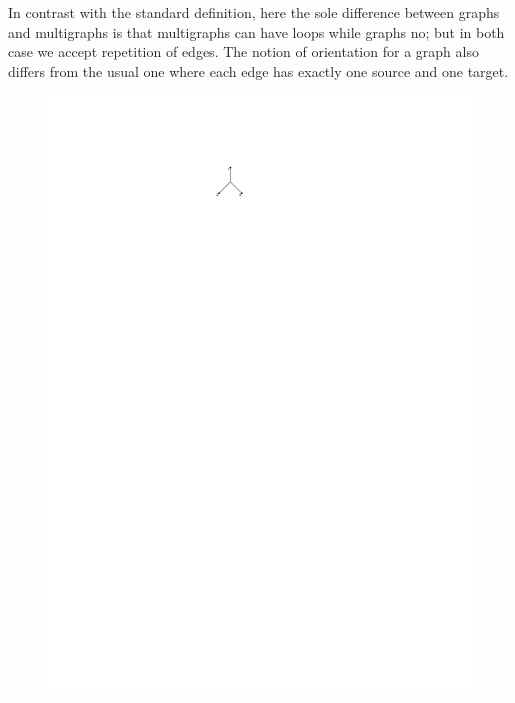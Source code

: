 \documentclass[a4paper]{article}
\theoremstyle{definition}
\begin{document}
In contrast with the standard definition, here the sole difference between graphs and multigraphs is that multigraphs can have loops while graphs no; but in both case we accept repetition of edges. The notion of orientation for a graph also differs from the usual one where each edge has exactly one source and one target.
\begin{figure}[htbp]
\begin{center}
\includegraphics[scale=1.5]{fig/he1}
\hspace{2cm}

\end{center}
\end{figure}
\end{document}
